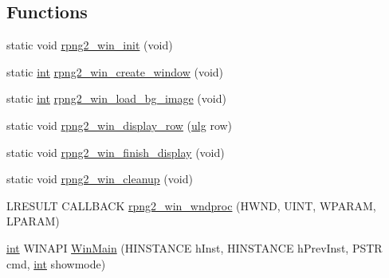 \subsection*{Functions}
\begin{DoxyCompactItemize}
\item 
static void \mbox{\hyperlink{rpng2-win_8c_a47fb2441423f2e30f4cfe4f427159e70}{rpng2\+\_\+win\+\_\+init}} (void)
\item 
static \mbox{\hyperlink{ioapi_8h_a787fa3cf048117ba7123753c1e74fcd6}{int}} \mbox{\hyperlink{rpng2-win_8c_a9316682fba34635203c7fe44a4a41103}{rpng2\+\_\+win\+\_\+create\+\_\+window}} (void)
\item 
static \mbox{\hyperlink{ioapi_8h_a787fa3cf048117ba7123753c1e74fcd6}{int}} \mbox{\hyperlink{rpng2-win_8c_a36ca0b965012c0dda68b0bd0485a70e5}{rpng2\+\_\+win\+\_\+load\+\_\+bg\+\_\+image}} (void)
\item 
static void \mbox{\hyperlink{rpng2-win_8c_ac1b02b7289e3c18572f9de09314a0326}{rpng2\+\_\+win\+\_\+display\+\_\+row}} (\mbox{\hyperlink{readpng_8h_abd6f60bf9450af2ecb94097a32c19a64}{ulg}} row)
\item 
static void \mbox{\hyperlink{rpng2-win_8c_a9b4d806dceb4ddfa57f4007272955357}{rpng2\+\_\+win\+\_\+finish\+\_\+display}} (void)
\item 
static void \mbox{\hyperlink{rpng2-win_8c_aa857074cb78142ee324e66d1b25d5234}{rpng2\+\_\+win\+\_\+cleanup}} (void)
\item 
L\+R\+E\+S\+U\+LT C\+A\+L\+L\+B\+A\+CK \mbox{\hyperlink{rpng2-win_8c_af35a8c9c18f04bd6f13dc0add6c528e9}{rpng2\+\_\+win\+\_\+wndproc}} (H\+W\+ND, U\+I\+NT, W\+P\+A\+R\+AM, L\+P\+A\+R\+AM)
\item 
\mbox{\hyperlink{ioapi_8h_a787fa3cf048117ba7123753c1e74fcd6}{int}} W\+I\+N\+A\+PI \mbox{\hyperlink{rpng2-win_8c_a2db31d959abfda840605268cd8ba1d08}{Win\+Main}} (H\+I\+N\+S\+T\+A\+N\+CE h\+Inst, H\+I\+N\+S\+T\+A\+N\+CE h\+Prev\+Inst, P\+S\+TR cmd, \mbox{\hyperlink{ioapi_8h_a787fa3cf048117ba7123753c1e74fcd6}{int}} showmode)
\end{DoxyCompactItemize}
